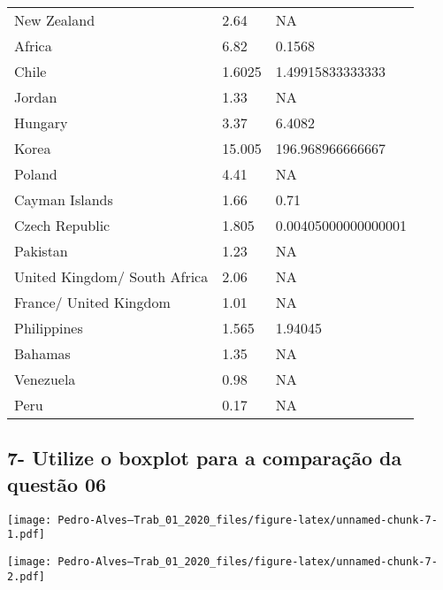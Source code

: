 \documentclass[
]{article}
\newenvironment{Shaded}{\begin{snugshade}}{\end{snugshade}}
\newcommand{\DataTypeTok}[1]{\textcolor[rgb]{0.13,0.29,0.53}{#1}}
\newcommand{\KeywordTok}[1]{\textcolor[rgb]{0.13,0.29,0.53}{\textbf{#1}}}
\newcommand{\NormalTok}[1]{#1}
\newcommand{\OperatorTok}[1]{\textcolor[rgb]{0.81,0.36,0.00}{\textbf{#1}}}
\newcommand{\StringTok}[1]{\textcolor[rgb]{0.31,0.60,0.02}{#1}}
\begin{document}
\begin{longtable}[]{@{}lll@{}}
New Zealand & 2.64 & NA\tabularnewline
Africa & 6.82 & 0.1568\tabularnewline
Chile & 1.6025 & 1.49915833333333\tabularnewline
Jordan & 1.33 & NA\tabularnewline
Hungary & 3.37 & 6.4082\tabularnewline
Korea & 15.005 & 196.968966666667\tabularnewline
Poland & 4.41 & NA\tabularnewline
Cayman Islands & 1.66 & 0.71\tabularnewline
Czech Republic & 1.805 & 0.00405000000000001\tabularnewline
Pakistan & 1.23 & NA\tabularnewline
United Kingdom/ South Africa & 2.06 & NA\tabularnewline
France/ United Kingdom & 1.01 & NA\tabularnewline
Philippines & 1.565 & 1.94045\tabularnewline
Bahamas & 1.35 & NA\tabularnewline
Venezuela & 0.98 & NA\tabularnewline
Peru & 0.17 & NA\tabularnewline
\bottomrule
\end{longtable}

\hypertarget{utilize-o-boxplot-para-a-comparauxe7uxe3o-da-questuxe3o-06}{%
\subsection{7- Utilize o boxplot para a comparação da questão
06}\label{utilize-o-boxplot-para-a-comparauxe7uxe3o-da-questuxe3o-06}}

\begin{Shaded}
\end{Shaded}

\texttt{[image: Pedro-Alves---Trab\_01\_2020\_files/figure-latex/unnamed-chunk-7-1.pdf]}

\begin{Shaded}
\end{Shaded}

\texttt{[image: Pedro-Alves---Trab\_01\_2020\_files/figure-latex/unnamed-chunk-7-2.pdf]}
\end{document}
